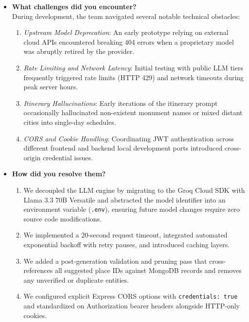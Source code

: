 \documentclass[12pt,a4paper,twoside,openright]{report}
\begin{document}
\begin{itemize}[leftmargin=*]
    \item \textbf{What challenges did you encounter?}\\
    During development, the team navigated several notable technical obstacles:
    \begin{enumerate}
        \item \textit{Upstream Model Deprecation}: An early prototype relying on external cloud APIs encountered breaking 404 errors when a proprietary model was abruptly retired by the provider.
        \item \textit{Rate Limiting and Network Latency}: Initial testing with public LLM tiers frequently triggered rate limits (HTTP 429) and network timeouts during peak server hours.
        \item \textit{Itinerary Hallucinations}: Early iterations of the itinerary prompt occasionally hallucinated non-existent monument names or mixed distant cities into single-day schedules.
        \item \textit{CORS and Cookie Handling}: Coordinating JWT authentication across different frontend and backend local development ports introduced cross-origin credential issues.
    \end{enumerate}

    \item \textbf{How did you resolve them?}\\
    \begin{enumerate}
        \item We decoupled the LLM engine by migrating to the Groq Cloud SDK with Llama 3.3 70B Versatile and abstracted the model identifier into an environment variable (\texttt{.env}), ensuring future model changes require zero source code modifications.
        \item We implemented a 20-second request timeout, integrated automated exponential backoff with retry pauses, and introduced caching layers.
        \item We added a post-generation validation and pruning pass that cross-references all suggested place IDs against MongoDB records and removes any unverified or duplicate entities.
        \item We configured explicit Express CORS options with \texttt{credentials: true} and standardized on Authorization bearer headers alongside HTTP-only cookies.
    \end{enumerate}
\end{itemize}

\cleardoublepage
\end{document}
